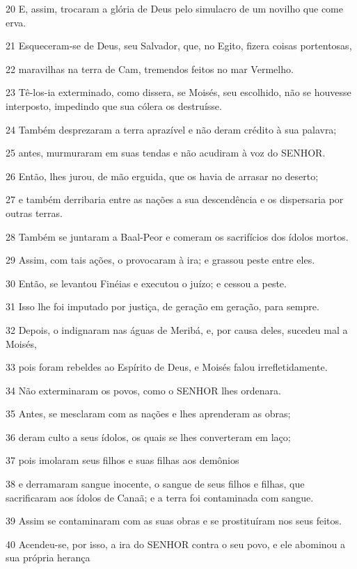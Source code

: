 \par 20 E, assim, trocaram a glória de Deus pelo simulacro de um novilho que come erva.
\par 21 Esqueceram-se de Deus, seu Salvador, que, no Egito, fizera coisas portentosas,
\par 22 maravilhas na terra de Cam, tremendos feitos no mar Vermelho.
\par 23 Tê-los-ia exterminado, como dissera, se Moisés, seu escolhido, não se houvesse interposto, impedindo que sua cólera os destruísse.
\par 24 Também desprezaram a terra aprazível e não deram crédito à sua palavra;
\par 25 antes, murmuraram em suas tendas e não acudiram à voz do SENHOR.
\par 26 Então, lhes jurou, de mão erguida, que os havia de arrasar no deserto;
\par 27 e também derribaria entre as nações a sua descendência e os dispersaria por outras terras.
\par 28 Também se juntaram a Baal-Peor e comeram os sacrifícios dos ídolos mortos.
\par 29 Assim, com tais ações, o provocaram à ira; e grassou peste entre eles.
\par 30 Então, se levantou Finéias e executou o juízo; e cessou a peste.
\par 31 Isso lhe foi imputado por justiça, de geração em geração, para sempre.
\par 32 Depois, o indignaram nas águas de Meribá, e, por causa deles, sucedeu mal a Moisés,
\par 33 pois foram rebeldes ao Espírito de Deus, e Moisés falou irrefletidamente.
\par 34 Não exterminaram os povos, como o SENHOR lhes ordenara.
\par 35 Antes, se mesclaram com as nações e lhes aprenderam as obras;
\par 36 deram culto a seus ídolos, os quais se lhes converteram em laço;
\par 37 pois imolaram seus filhos e suas filhas aos demônios
\par 38 e derramaram sangue inocente, o sangue de seus filhos e filhas, que sacrificaram aos ídolos de Canaã; e a terra foi contaminada com sangue.
\par 39 Assim se contaminaram com as suas obras e se prostituíram nos seus feitos.
\par 40 Acendeu-se, por isso, a ira do SENHOR contra o seu povo, e ele abominou a sua própria herança
